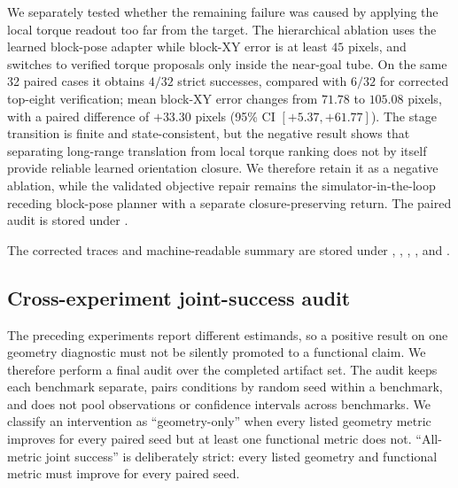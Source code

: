 \documentclass{article}
\begin{document}
We separately tested whether the remaining failure was caused by applying the
local torque readout too far from the target.  The hierarchical ablation uses
the learned block-pose adapter while block-XY error is at least $45$ pixels,
and switches to verified torque proposals only inside the near-goal tube.
On the same 32 paired cases it obtains $4/32$ strict successes, compared with
$6/32$ for corrected top-eight verification; mean block-XY error changes from
$71.78$ to $105.08$ pixels, with a paired difference of $+33.30$ pixels
(95\% CI $[+5.37,+61.77]$).  The stage transition is finite and
state-consistent, but the negative result shows that separating long-range
translation from local torque ranking does not by itself provide reliable
learned orientation closure.  We therefore retain it as a negative ablation,
while the validated objective repair remains the simulator-in-the-loop
receding block-pose planner with a separate closure-preserving return.
The paired audit is stored under
.

The corrected traces and machine-readable summary are stored under
,
,
,
, and
.

\subsection{Cross-experiment joint-success audit}
\label{sec:supp-deep-claim-matrix}

The preceding experiments report different estimands, so a positive result on
one geometry diagnostic must not be silently promoted to a functional claim.
We therefore perform a final audit over the completed artifact set. The audit
keeps each benchmark separate, pairs conditions by random seed within a
benchmark, and does not pool observations or confidence intervals across
benchmarks. We classify an intervention as ``geometry-only'' when every
listed geometry metric improves for every paired seed but at least one
functional metric does not. ``All-metric joint success'' is deliberately
strict: every listed geometry and functional metric must improve for every
paired seed.
\end{document}
